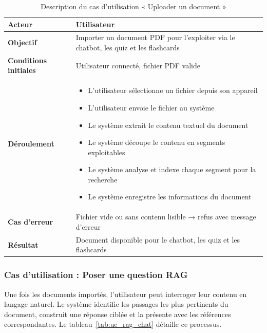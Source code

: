 \begin{table}[H]
\centering
\renewcommand{\arraystretch}{1.2}
\begin{tabular}{|p{4cm}|p{10cm}|}
\hline
\textbf{Acteur} & Utilisateur \\ \hline
\textbf{Objectif} & Importer un document PDF pour l'exploiter via le chatbot,
                    les quiz et les flashcards \\ \hline
\textbf{Conditions initiales} & Utilisateur connecté, fichier PDF valide \\ \hline
\textbf{Déroulement} &
\begin{itemize}
    \item L'utilisateur sélectionne un fichier depuis son appareil
    \item L'utilisateur envoie le fichier au système
    \item Le système extrait le contenu textuel du document
    \item Le système découpe le contenu en segments exploitables
    \item Le système analyse et indexe chaque segment pour la recherche
    \item Le système enregistre les informations du document
\end{itemize} \\ \hline
\textbf{Cas d'erreur} & Fichier vide ou sans contenu lisible → refus avec
                        message d'erreur \\ \hline
\textbf{Résultat} & Document disponible pour le chatbot, les quiz et les flashcards \\ \hline
\end{tabular}
\caption{Description du cas d'utilisation « Uploader un document »}
\label{tab:uc_upload}
\end{table}

\subsubsection{Cas d'utilisation : Poser une question RAG}

Une fois les documents importés, l'utilisateur peut interroger leur contenu en langage naturel. Le système identifie les passages les plus pertinents du document, construit une réponse ciblée et la présente avec les références correspondantes. Le tableau~\ref{tab:uc_rag_chat} détaille ce processus.

